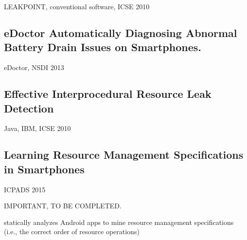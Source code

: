 LEAKPOINT, conventional software, ICSE 2010

\subsection{eDoctor Automatically Diagnosing Abnormal Battery Drain Issues on
  Smartphones.}

eDoctor, NSDI 2013

\subsection{Effective Interprocedural Resource Leak Detection}

Java, IBM, ICSE 2010

\subsection{Learning Resource Management Specifications in Smartphones}

ICPADS 2015

IMPORTANT, TO BE COMPLETED.

statically analyzes Android apps to mine resource management specifications
(i.e., the correct order of resource operations)



